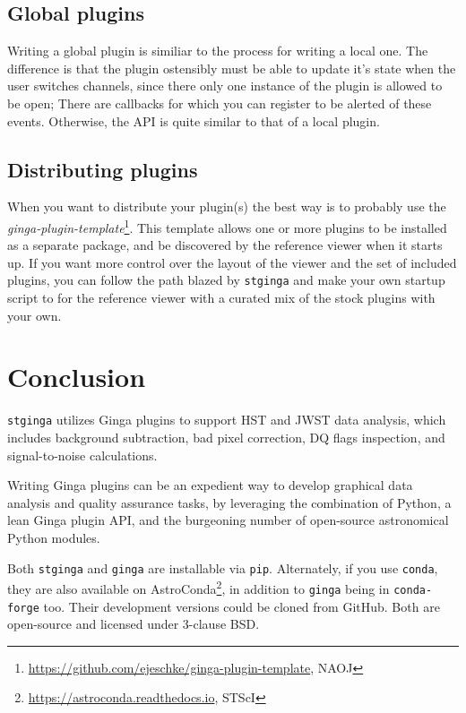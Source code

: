 \documentclass[11pt,twoside]{article}
\begin{document}
\subsection{Global plugins}

Writing a global plugin is similiar to the process for writing a local
one.  The difference is that the plugin ostensibly must be able to
update it's state when the user switches channels, since there only
one instance of the plugin is allowed to be open; There are callbacks
for which you can register to be alerted of these events. Otherwise,
the API is quite similar to that of a local plugin.

\subsection{Distributing plugins}

When you want to distribute your plugin(s) the best way is to probably use
the {\em ginga-plugin-template}\footnote{\url{https://github.com/ejeschke/ginga-plugin-template}, NAOJ}.
This template allows one
or more plugins to be installed as a separate package, and be
discovered by the reference viewer when it starts up.  If you want
more control over the layout of the viewer and the set of included
plugins, you can follow the path blazed by {\tt stginga} and make your own
startup script to for the reference viewer with a curated mix of the
stock plugins with your own.

\section{Conclusion}

{\tt stginga} utilizes Ginga plugins to support HST and JWST data analysis,
which includes background subtraction, bad pixel correction, DQ flags
inspection, and signal-to-noise calculations.

Writing Ginga plugins can be an expedient way to develop graphical data
analysis and quality assurance tasks, by leveraging the combination of
Python, a lean Ginga plugin API, and the burgeoning number of open-source
astronomical Python modules.

Both {\tt stginga} and {\tt ginga} are installable via {\tt pip}. Alternately,
if you use {\tt conda}, they are also available on
AstroConda\footnote{\url{https://astroconda.readthedocs.io}, STScI},
in addition to {\tt ginga} being in  {\tt conda-forge} too. Their development
versions could be cloned from GitHub. Both are open-source and licensed under
3-clause BSD.


\end{document}
